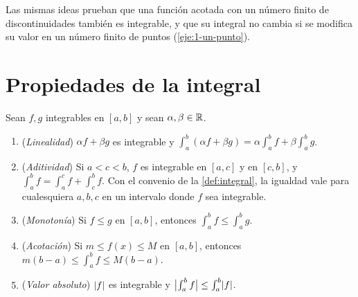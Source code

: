 Las mismas ideas prueban que una función acotada con un número finito de discontinuidades también es integrable, y que su integral no cambia si se modifica su valor en un número finito de puntos (\cref{eje:1-un-punto}).

\section{Propiedades de la integral}

\begin{teorema}\label{teo:propiedades}
Sean $f,g$ integrables en $[a,b]$ y sean $\alpha,\beta\in\mathbb{R}$.
\begin{enumerate}
  \item (\emph{Linealidad}) $\alpha f+\beta g$ es integrable y $\int_a^b(\alpha f+\beta g)=\alpha\int_a^b f+\beta\int_a^b g$.
  \item (\emph{Aditividad}) Si $a<c<b$, $f$ es integrable en $[a,c]$ y en $[c,b]$, y $\int_a^b f=\int_a^c f+\int_c^b f$. Con el convenio de la \cref{def:integral}, la igualdad vale para cualesquiera $a,b,c$ en un intervalo donde $f$ sea integrable.
  \item (\emph{Monotonía}) Si $f\le g$ en $[a,b]$, entonces $\int_a^b f\le\int_a^b g$.
  \item (\emph{Acotación}) Si $m\le f(x)\le M$ en $[a,b]$, entonces $m(b-a)\le\int_a^b f\le M(b-a)$.
  \item (\emph{Valor absoluto}) $\lvert f\rvert$ es integrable y $\bigl|\int_a^b f\bigr|\le\int_a^b\lvert f\rvert$.
\end{enumerate}
\end{teorema}

\addtocounter{definicion}{1}%

\addtocounter{definicion}{1}%

\addtocounter{definicion}{1}%

